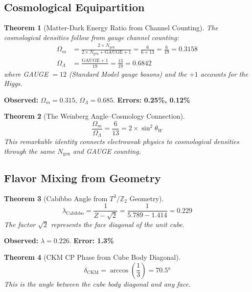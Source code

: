 \documentclass[11pt,a4paper]{article}
\theoremstyle{plain}
\newtheorem{theorem}{Theorem}[section]
\theoremstyle{definition}
\theoremstyle{remark}
\newcommand{\Ngen}{N_{\text{gen}}}
\newcommand{\thetaW}{\theta_W}
\newcommand{\Omegam}{\Omega_m}
\newcommand{\OmegaL}{\Omega_\Lambda}
\newcommand{\Tthree}{T^3}
\newcommand{\Ztwo}{\mathbb{Z}_2}
\begin{document}
\subsection{Cosmological Equipartition}

\begin{theorem}[Matter-Dark Energy Ratio from Channel Counting]
The cosmological densities follow from gauge channel counting:
\begin{align}
\Omegam &= \frac{2 \times \Ngen}{2 \times \Ngen + \text{GAUGE} + 1} = \frac{6}{6 + 13} = \boxed{\frac{6}{19} = 0.3158} \\
\OmegaL &= \frac{\text{GAUGE} + 1}{19} = \frac{13}{19} = \boxed{0.6842}
\end{align}
where GAUGE $= 12$ (Standard Model gauge bosons) and the $+1$ accounts for the Higgs.
\end{theorem}

\textbf{Observed:} $\Omegam = 0.315$, $\OmegaL = 0.685$. \textbf{Errors: 0.25\%, 0.12\%}

\begin{theorem}[The Weinberg Angle--Cosmology Connection]
\begin{equation}
\boxed{\frac{\Omegam}{\OmegaL} = \frac{6}{13} = 2 \times \sin^2\thetaW}
\end{equation}
This remarkable identity connects electroweak physics to cosmological densities through the same $\Ngen$ and GAUGE counting.
\end{theorem}

\subsection{Flavor Mixing from Geometry}

\begin{theorem}[Cabibbo Angle from $\Tthree/\Ztwo$ Geometry]
\begin{equation}
\boxed{\lambda_{\text{Cabibbo}} = \frac{1}{Z - \sqrt{2}} = \frac{1}{5.789 - 1.414} = 0.229}
\end{equation}
The factor $\sqrt{2}$ represents the face diagonal of the unit cube.
\end{theorem}

\textbf{Observed:} $\lambda = 0.226$. \textbf{Error: 1.3\%}

\begin{theorem}[CKM CP Phase from Cube Body Diagonal]
\begin{equation}
\boxed{\delta_{\text{CKM}} = \arccos\left(\frac{1}{3}\right) = 70.5°}
\end{equation}
This is the angle between the cube body diagonal and any face.
\end{theorem}
\end{document}

